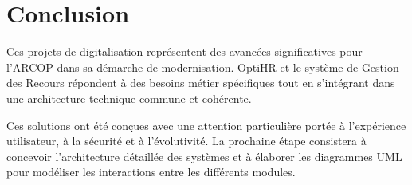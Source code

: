 




\section{Conclusion}
Ces projets de digitalisation représentent des avancées significatives pour l'ARCOP dans sa démarche de modernisation. OptiHR et le système de Gestion des Recours répondent à des besoins métier spécifiques tout en s'intégrant dans une architecture technique commune et cohérente.

Ces solutions ont été conçues avec une attention particulière portée à l'expérience utilisateur, à la sécurité et à l'évolutivité. La prochaine étape consistera à concevoir l'architecture détaillée des systèmes et à élaborer les diagrammes UML pour modéliser les interactions entre les différents modules.

\clearpage